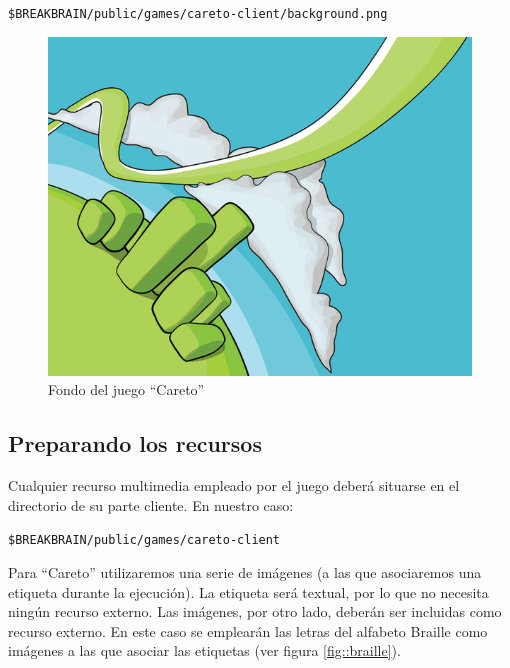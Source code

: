\begin{enumerate}
\begin{center}
    {\tt \$BREAKBRAIN/public/games/careto-client/background.png}

    \begin{figure}[H]
      \begin{center}
        \includegraphics[scale=0.5]{images/careto-background.png}
        \caption{Fondo del juego ``Careto''}
      \end{center}
    \end{figure}
  \end{center}

\end{enumerate}

\subsection{Preparando los recursos}

Cualquier recurso multimedia empleado por el juego deberá situarse en el directorio de su parte cliente. En nuestro caso:
\begin{center}
  {\tt \$BREAKBRAIN/public/games/careto-client}
\end{center}

Para ``Careto'' utilizaremos una serie de imágenes (a las que asociaremos una etiqueta durante la ejecución). La etiqueta será textual, por lo que no necesita ningún recurso externo. Las imágenes, por otro lado, deberán ser incluidas como recurso externo. En este caso se emplearán las letras del alfabeto Braille como imágenes a las que asociar las etiquetas (ver figura \ref{fig::braille}).

